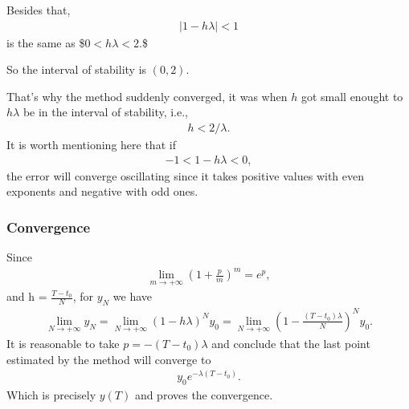 \documentclass[letterpaper,10pt,english]{jupyterBook}
\begin{document}
\sphinxAtStartPar
Besides that,
\begin{equation*}
\begin{split}
|1 - h \lambda| < 1
\end{split}
\end{equation*}
\sphinxAtStartPar
is the same as
\$\(
0 < h \lambda < 2.
\)\$

\sphinxAtStartPar
So the interval of stability is \((0,2)\).

\sphinxAtStartPar
That’s why the method suddenly converged, it was when \(h\) got small enought to \(h \lambda\) be in the interval of stability, i.e.,
\begin{equation*}
\begin{split}
    h < 2/\lambda.
\end{split}
\end{equation*}
\sphinxAtStartPar
It is worth mentioning here that if
\begin{equation*}
\begin{split}
-1 < 1 - h \lambda < 0,
\end{split}
\end{equation*}
\sphinxAtStartPar
the error will converge oscillating since it takes positive values with even exponents and negative with odd ones.


\subsubsection{Convergence}
\label{\detokenize{cap2:convergence}}
\sphinxAtStartPar
Since
\begin{equation*}
\begin{split}
\lim_{m \to +\infty} \left(1 + \frac{p}{m} \right)^m = e^p,
\end{split}
\end{equation*}
\sphinxAtStartPar
and h = \(\frac{T-t_0}{N}\), for \(y_N\) we have
\begin{equation*}
\begin{split}
\lim_{N \to +\infty} y_N = \lim_{N \to +\infty} \left(1 - h \lambda \right)^N y_0 = \lim_{N \to +\infty} \left(1 - \frac{(T-t_0) \lambda}{N} \right)^N y_0.
\end{split}
\end{equation*}
\sphinxAtStartPar
It is reasonable to take \(p = -(T-t_0) \lambda\) and conclude that the last point estimated by the method will converge to
\begin{equation*}
\begin{split}
y_0e^{-\lambda (T-t_0)}.
\end{split}
\end{equation*}
\sphinxAtStartPar
Which is precisely \(y(T)\) and proves the convergence.
\end{document}
